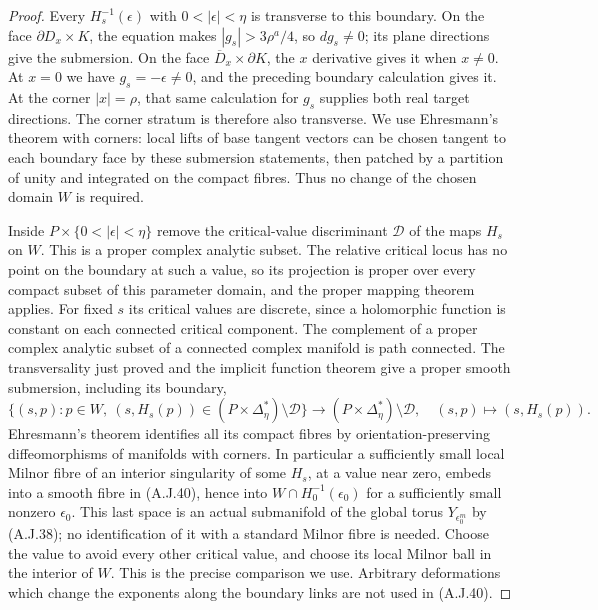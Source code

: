 \begin{proof}
Every $H_s^{-1}(\epsilon)$ with
$0<|\epsilon|<\eta$ is transverse to this boundary.
On the face $\partial D_x\times K$, the equation
makes $|g_s|>3\rho^a/4$, so $dg_s\ne0$; its plane
directions give the submersion. On the face
$\overline D_x\times\partial K$, the $x$
derivative gives it when $x\ne0$. At $x=0$ we
have $g_s=-\epsilon\ne0$, and the preceding
boundary calculation gives it. At the corner
$|x|=\rho$, that same calculation for $g_s$
supplies both real target directions. The corner
stratum is therefore also transverse. We use
Ehresmann's theorem with corners: local lifts of
base tangent vectors can be chosen tangent to
each boundary face by these submersion statements,
then patched by a partition of unity and
integrated on the compact fibres. Thus no change
of the chosen domain $W$ is required.

Inside $P\times\{0<|\epsilon|<\eta\}$ remove the
critical-value discriminant $\mathcal D$ of the
maps $H_s$ on $W$. This is a proper complex
analytic subset. The relative critical locus has
no point on the boundary at such a value, so its
projection is proper over every compact subset
of this parameter domain, and the proper mapping
theorem applies. For fixed $s$ its critical
values are discrete, since a holomorphic function
is constant on each connected critical component.
The complement of a proper complex analytic
subset of a connected complex manifold is path
connected. The transversality just proved and
the implicit function theorem give a proper
smooth submersion, including its boundary,
\[
 \{(s,p):p\in W,\ (s,H_s(p))\in
                    (P\times\Delta_\eta^*)\setminus\mathcal D\}
 \longrightarrow
       (P\times\Delta_\eta^*)\setminus\mathcal D,
 \quad (s,p)\longmapsto(s,H_s(p)).                 \tag{A.J.40}
\]
Ehresmann's theorem identifies all its compact
fibres by orientation-preserving diffeomorphisms
of manifolds with corners.
In particular a sufficiently small local Milnor
fibre of an interior singularity of some $H_s$,
at a value near zero, embeds into a smooth fibre
in (A.J.40), hence into
$W\cap H_0^{-1}(\epsilon_0)$ for a sufficiently
small nonzero $\epsilon_0$. This last space is
an actual submanifold of the global torus
$Y_{\epsilon_0^m}$ by (A.J.38); no identification
of it with a standard Milnor fibre is needed.
Choose the value to avoid every other
critical value, and choose its local Milnor ball
in the interior of $W$. This is the precise
comparison we use. Arbitrary deformations which
change the exponents along the boundary links
are not used in (A.J.40).


\end{proof}
